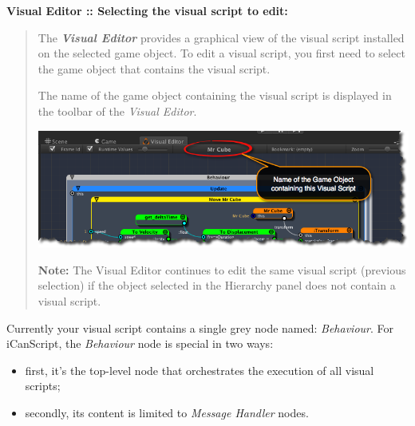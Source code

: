 \begin{tipbox}
\textbf{Visual Editor :: Selecting the visual script to edit:}

\begin{quote}

The \emph{\textbf{Visual Editor}} provides a graphical view of the visual script installed on the selected game object. To edit a visual script, you first need to select the game object that contains the visual script.

The name of the game object containing the visual script is displayed in the toolbar of the \emph{Visual Editor}.

\includegraphics[width=351pt,height=110pt]{name-of-object-including-visual-script.png}

\textbf{Note:} The Visual Editor continues to edit the same visual script (previous selection) if the object selected in the Hierarchy panel does not contain a visual script.
\end{quote}

\end{tipbox}



Currently your visual script contains a single grey node named: \emph{Behaviour}. For iCanScript, the \emph{Behaviour} node is special in two ways:

\begin{itemize}
\item first, it's the top-level node that orchestrates the execution of all visual scripts;

\item secondly, its content is limited to \emph{Message Handler} nodes.

\end{itemize}

